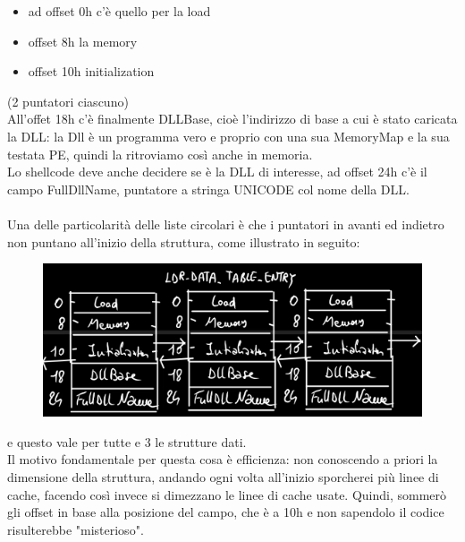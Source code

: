\documentclass[12pt, oneside]{extbook}
\begin{document}
\begin{itemize}
	\item ad offset 0h c'è quello per la load
	\item offset 8h la memory
	\item offset 10h initialization
\end{itemize}
(2 puntatori ciascuno)\\All'offet 18h c'è finalmente DLLBase, cioè l'indirizzo di base a cui è stato caricata la DLL: la Dll è un programma vero e proprio con una sua MemoryMap e la sua testata PE, quindi la ritroviamo così anche in memoria.\\Lo shellcode deve anche decidere se è la DLL di interesse, ad offset 24h c'è il campo FullDllName, puntatore a stringa UNICODE col nome della DLL.\\\\Una delle particolarità delle liste circolari è che i puntatori in avanti ed indietro non puntano all'inizio della struttura, come illustrato in seguito:
\begin{figure}[!h]
	\includegraphics[scale=0.5]{immagini/ldr_struct.png}
\end{figure}
e questo vale per tutte e 3 le strutture dati.\\Il motivo fondamentale per questa cosa è efficienza: non conoscendo a priori la dimensione della struttura, andando ogni volta all'inizio sporcherei più linee di cache, facendo così invece si dimezzano le linee di cache usate. Quindi, sommerò gli offset in base alla posizione del campo, che è a 10h e non sapendolo il codice risulterebbe "misterioso".
\end{document}

